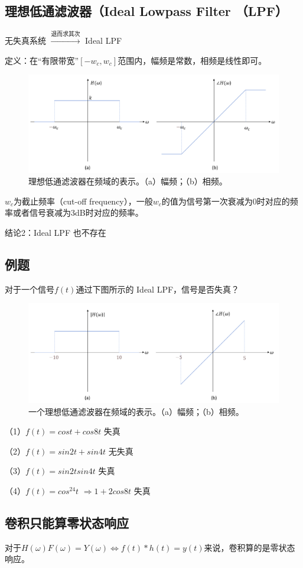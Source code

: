 \documentclass[UTF8]{ctexart}
\begin{document}
\subsection{理想低通滤波器（Ideal Lowpass Filter （LPF）}
无失真系统 \(\xrightarrow{\text{退而求其次}}\) Ideal LPF \par
定义：在“有限带宽”$[-w_c,w_c] $范围内，幅频是常数，相频是线性即可。
\begin{figure}[h]
    \centering         %
    \includegraphics[scale=0.32]{2.png}
    \caption{理想低通滤波器在频域的表示。（a）幅频；（b）相频。}
\end{figure}
$w_c$为截止频率（cut-off frequency），一般$w_c$的值为信号第一次衰减为0时对应的频率或者信号衰减为3dB时对应的频率。\par
结论2：Ideal LPF 也不存在
\subsection{例题}
对于一个信号$f(t)$通过下图所示的 Ideal LPF，信号是否失真？\par
\begin{figure}[h]
    \centering         %
    \includegraphics[scale=0.22]{3.png}
    \caption{一个理想低通滤波器在频域的表示。（a）幅频；（b）相频。}
\end{figure}
（1）$f(t)=cost+cos8t$ \qquad \qquad \quad 失真 \par
（2）$f(t)=sin2t+sin4t$ \qquad \qquad \; 无失真 \par
（3）$f(t)=sin2t sin4t$ \qquad \qquad \qquad 失真 \par
（4）$f(t)=cos^24t$  $\Rightarrow 1+2cos8t$ \qquad 失真\par
\subsection{卷积只能算零状态响应}
对于$H(\omega)F(\omega)=Y(\omega)\Leftrightarrow f(t)\ast h(t)=y(t)$来说，卷积算的是零状态响应。
\end{document}
